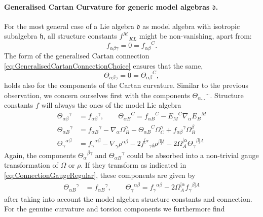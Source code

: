 \documentclass[11pt,a4paper]{article}
\numberwithin{equation}{section}
\begin{document}
\paragraph{Generalised Cartan Curvature for generic model algebras $\mathfrak{d}$.} For the most general case of a Lie algebra $\mathfrak{d}$ as model algebra with isotropic subalgebra $\mathfrak{h}$, all structure constants ${f^\mathcal{M}}_{KL}$ might be non-vanishing, apart from:
\begin{equation}
    {f_{\alpha\beta\gamma}} = 0 = {f_{\alpha \beta}}^C. 
\end{equation}
The form of the generalised Cartan connection \eqref{eq:GeneralisedCartanConnectionChoice} ensures that the same,
\begin{equation}
    {\Theta_{\alpha\beta\gamma}} = 0 = {\Theta_{\alpha \beta}}^C,
\end{equation}
holds also for the components of the Cartan curvature. Similar to the previous observation, we concern ourselves first with the components ${\Theta_{\alpha ...}}^{...}$. Structure constants $f$ will always the ones of the model Lie algebra  
\begin{align}
	{\Theta_{\alpha \beta}}^\gamma &= {f_{\alpha \beta}}^\gamma \nonumber, \qquad {\Theta_{\alpha B}}^C = {f_{\alpha B}}^C - {E_M}^C \nabla_\alpha {E_B}^M \nonumber \\
  {\Theta_{\alpha B}}^\gamma &= {f_{\alpha B}}^\gamma - \nabla_\alpha \Omega_B^\gamma - {\Theta_{\alpha B}}^C \Omega_C^\gamma + {f_{\alpha \beta}}^\gamma \Omega_B^\beta \label{eq:GeneralisedCartanCurvatureExplicitGeneric1} \\
	{\Theta_{\gamma}}^{\alpha \beta} &= {f_\gamma}^{\alpha \beta} - \nabla_\gamma \rho^{\alpha\beta} - 2 {f^{[\alpha}}_{\gamma\delta} \rho^{\beta] \delta} - 2 \Omega^{[\alpha}_A {\Theta_\gamma}^{\beta]A}  \label{eq:GeneralisedCartanCurvatureExplicitGeneric2}
\end{align}
Again, the components ${\Theta_{\alpha}}^{\beta \gamma}$ and ${\Theta_{\alpha B}}^\gamma$ could be absorbed into a non-trivial gauge transformation of $\Omega$ or $\rho$. If they transform as indicated in \eqref{eq:ConnectionGaugeRegular}, these components are given by
\begin{align}
    {\Theta_{\alpha B}}^\gamma &= {f_{\alpha B}}^\gamma, \qquad
	{\Theta_{\gamma}}^{\alpha \beta} = {f_\gamma}^{\alpha \beta} - 2 \Omega^{[\alpha}_A {f_\gamma}^{\beta]A}
\end{align}
after taking into account the model algebra structure constants and connection. For the genuine curvature and torsion components we furthermore find
\end{document}
